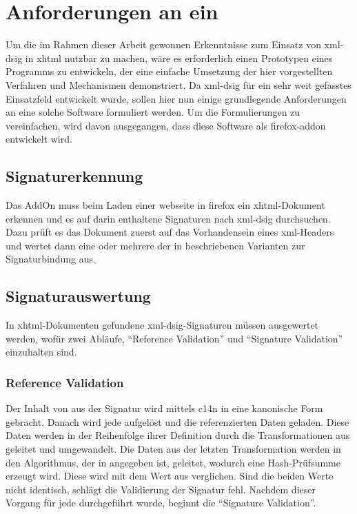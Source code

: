 
\chapter{Anforderungen an ein }
\label{chap:Anforderungen}
Um die im Rahmen dieser Arbeit gewonnen Erkenntnisse zum Einsatz von \gls{xml-dsig} in \gls{xhtml} nutzbar zu machen, wäre es erforderlich einen Prototypen
eines Programms zu entwickeln, der eine einfache Umsetzung der hier vorgestellten Verfahren und Mechanismen demonstriert. Da \gls{xml-dsig} für ein sehr weit
gefasstes Einsatzfeld entwickelt wurde, sollen hier nun einige grundlegende Anforderungen an eine solche Software formuliert werden. Um die Formulierungen zu
vereinfachen, wird davon ausgegangen, dass diese Software als \gls{firefox-addon} entwickelt wird.

\section{Signaturerkennung}
\label{sec:Anforderungen:Signaturerkennung}
Das AddOn muss beim Laden einer \gls{webseite} in \gls{firefox} ein \gls{xhtml}-Dokument erkennen und es auf darin enthaltene Signaturen nach \gls{xml-dsig}
durchsuchen. Dazu prüft es das Dokument zuerst auf das Vorhandensein eines \gls{xml}-Headers und wertet dann eine oder mehrere der in
 beschriebenen Varianten zur Signaturbindung aus.

\section{Signaturauswertung}
\label{sec:Anforderungen:Signaturauswertung}
In \gls{xhtml}-Dokumenten gefundene \gls{xml-dsig}-Signaturen müssen ausgewertet werden, wofür zwei Abläufe, "`Reference Validation"' und "`Signature
Validation"' einzuhalten sind.

\subsection{Reference Validation}
Der Inhalt von  aus der Signatur wird mittels \gls{c14n} in eine kanonische Form gebracht. Danach wird jede  aufgelöst
und die referenzierten Daten geladen. Diese Daten werden in der Reihenfolge ihrer Definition durch die Transformationen aus  geleitet und
umgewandelt. Die Daten aus der letzten Transformation werden in den Algorithmus, der in  angegeben ist, geleitet, wodurch eine
Hash-Prüfsumme erzeugt wird. Diese wird mit dem Wert aus  verglichen. Sind die beiden Werte nicht identisch, schlägt die Validierung der
Signatur fehl. Nachdem dieser Vorgang für jede  durchgeführt wurde, beginnt die "`Signature Validation"'.

